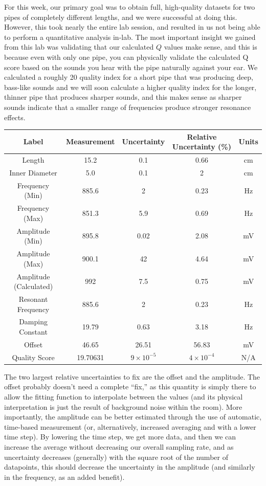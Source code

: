 \documentclass[12pt]{extarticle}
\begin{document}
For this week, our primary goal was to obtain full, high-quality datasets for two pipes of completely different lengths, and we were successful at doing this. However, this took nearly the entire lab session, and resulted in us not being able to perform a quantitative analysis in-lab. The most important insight we gained from this lab was validating that our calculated $Q$ values make sense, and this is because even with only one pipe, you can physically validate the calculated Q score based on the sounds you hear with the pipe naturally against your ear. We calculated a roughly 20 quality index for a short pipe that was producing deep, bass-like sounds and we will soon calculate a higher quality index for the longer, thinner pipe that produces sharper sounds, and this makes sense as sharper sounds indicate that a smaller range of frequencies produce stronger resonance effects.

\begin{table}[h!]
  \begin{tabular}{|c|c|c|c|c|}
    \hline
    Label & Measurement & Uncertainty & Relative Uncertainty (\%) & Units \\
    \hline
    Length & 15.2 & 0.1 & 0.66 & cm \\
    Inner Diameter & 5.0 & 0.1 & 2 & cm \\
    Frequency (Min) & 885.6 & 2 & 0.23 & Hz \\
    Frequency (Max) & 851.3 & 5.9 & 0.69 & Hz \\
    Amplitude (Min) & 895.8 & 0.02 & 2.08 & mV \\
    Amplitude (Max) & 900.1 & 42 & 4.64 & mV \\
    Amplitude (Calculated) & 992 & 7.5 & 0.75 & mV \\
    Resonant Frequency & 885.6 & 2 & 0.23 & Hz \\
    Damping Constant & 19.79 & 0.63 & 3.18 & Hz \\ 
    Offset & 46.65 & 26.51 & 56.83 & mV \\
    Quality Score & 19.70631 & $9 \times 10^{-5}$ & $4 \times 10^{-4}$ & N/A \\
    \hline
  \end{tabular}
\end{table}

The two largest relative uncertainties to fix are the offset and the amplitude. The offset probably doesn't need a complete ``fix,'' as this quantity is simply there to allow the fitting function to interpolate between the values (and its physical interpretation is just the result of background noise within the room). More importantly, the amplitude can be better estimated through the use of automatic, time-based measurement (or, alternatively, increased averaging and with a lower time step). By lowering the time step, we get more data, and then we can increase the average without decreasing our overall sampling rate, and as uncertainty decreases (generally) with the square root of the number of datapoints, this should decrease the uncertainty in the amplitude (and similarly in the frequency, as an added benefit).
\end{document}
